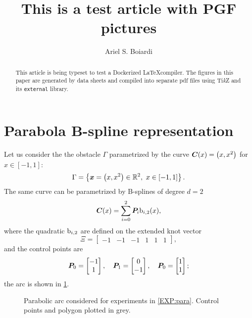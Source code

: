 \documentclass{article}
\title{This is a test article with PGF pictures}
\author{Ariel S. Boiardi}
\begin{document}
    \maketitle

    \begin{abstract}
        This article is being typeset to test a Dockerized \LaTeX compiler.
        The figures in this paper are generated by data sheets and compiled into separate pdf files using Ti\textit{k}Z and its \texttt{external} library.
    \end{abstract}

\section{Parabola B-spline representation}
Let us consider the  the obstacle $\Gamma$ parametrized by the curve $\bm{C}(x) = \left( x, x^2 \right)$ for $x \in \left[-1, 1\right]$:
\begin{equation}\label{EXP:para:eq:boundary}
	\Gamma = \left\{ \bm{x} = \left(x, x ^2\right) \in \mathbb{R}^2 ,\ x \in [-1,1] \right\}.
\end{equation} 
The same curve can be parametrized by B-splines of degree $d=2$ 
\begin{equation*}
	\bm{C}(x) = \sum_{i=0}^{2} \bm{P}_i \mathrm{b}_{i, 2}(x),
\end{equation*}
where the quadratic $\mathrm{b}_{i, 2}$ are defined on the extended knot vector 
\begin{equation*}
	\Xi = 
	\begin{bmatrix}
		-1 &-1 &-1 & 1 & 1 & 1
	\end{bmatrix},
\end{equation*}
and the control points are 
\begin{equation*}
	\bm{P}_0 
	=
	\begin{bmatrix}
		-1 \\ 1
	\end{bmatrix},
	\quad
	\bm{P}_1 
	=
	\begin{bmatrix}
		0 \\ -1
	\end{bmatrix},
	\quad
	\bm{P}_0 
	=
	\begin{bmatrix}
		1 \\ 1
	\end{bmatrix};
\end{equation*}
the arc is shown in \cref{EXP:para:fig:parabolic_arc}.
\begin{figure}
	\centering
	\caption{Parabolic arc considered for experiments in \cref{EXP:para}. Control points and polygon plotted in grey.}
	\label{EXP:para:fig:parabolic_arc}
\end{figure}
\end{document}
